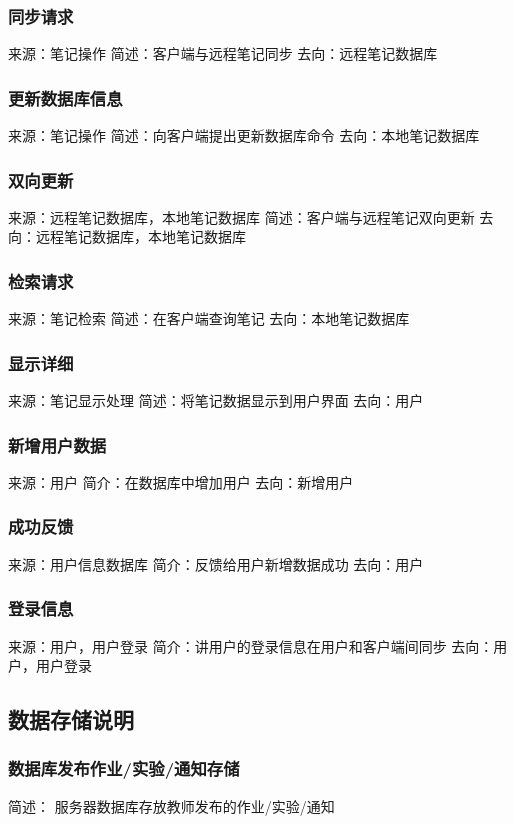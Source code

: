 \subsubsection{同步请求}
来源：笔记操作
简述：客户端与远程笔记同步
去向：远程笔记数据库

\subsubsection{更新数据库信息}
来源：笔记操作
简述：向客户端提出更新数据库命令
去向：本地笔记数据库

\subsubsection{双向更新}
来源：远程笔记数据库，本地笔记数据库
简述：客户端与远程笔记双向更新
去向：远程笔记数据库，本地笔记数据库

\subsubsection{检索请求}
来源：笔记检索
简述：在客户端查询笔记
去向：本地笔记数据库

\subsubsection{显示详细}
来源：笔记显示处理
简述：将笔记数据显示到用户界面
去向：用户

\subsubsection{新增用户数据}
来源：用户
简介：在数据库中增加用户
去向：新增用户

\subsubsection{成功反馈}
来源：用户信息数据库
简介：反馈给用户新增数据成功
去向：用户

\subsubsection{登录信息}
来源：用户，用户登录
简介：讲用户的登录信息在用户和客户端间同步
去向：用户，用户登录


\subsection{数据存储说明}
\subsubsection{数据库发布作业/实验/通知存储}
简述： 服务器数据库存放教师发布的作业/实验/通知

